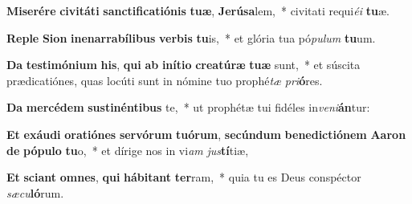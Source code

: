 \item \textbf{Mi}\textbf{se}\textbf{ré}\textbf{re} \textbf{ci}\textbf{vi}\textbf{tá}\textbf{ti} \textbf{sanc}\textbf{ti}\textbf{fi}\textbf{ca}\textbf{ti}\textbf{ó}\textbf{nis} \textbf{tu}\textbf{æ}, \textbf{Je}\textbf{rú}\textbf{sa}lem,~* civitati requi\textit{é}\textit{i} \textbf{tu}æ.
\item \textbf{Re}\textbf{ple} \textbf{Si}\textbf{on} \textbf{in}\textbf{e}\textbf{nar}\textbf{ra}\textbf{bí}\textbf{li}\textbf{bus} \textbf{ver}\textbf{bis} \textbf{tu}is,~* et glória tua pó\textit{pu}\textit{lum} \textbf{tu}um.
\item \textbf{Da} \textbf{tes}\textbf{ti}\textbf{mó}\textbf{ni}\textbf{um} \textbf{his}, \textbf{qui} \textbf{ab} \textbf{in}\textbf{í}\textbf{ti}\textbf{o} \textbf{cre}\textbf{a}\textbf{tú}\textbf{ræ} \textbf{tu}\textbf{æ} sunt,~* et súscita prædicatiónes, quas locúti sunt in nómine tuo prophé\textit{tæ} \textit{pri}\textbf{ó}res.
\item \textbf{Da} \textbf{mer}\textbf{cé}\textbf{dem} \textbf{sus}\textbf{ti}\textbf{nén}\textbf{ti}\textbf{bus} te,~* ut prophétæ tui fidéles in\textit{ve}\textit{ni}\textbf{án}tur:
\item \textbf{Et} \textbf{ex}\textbf{áu}\textbf{di} \textbf{o}\textbf{ra}\textbf{ti}\textbf{ó}\textbf{nes} \textbf{ser}\textbf{vó}\textbf{rum} \textbf{tu}\textbf{ó}\textbf{rum}, \textbf{se}\textbf{cún}\textbf{dum} \textbf{be}\textbf{ne}\textbf{dic}\textbf{ti}\textbf{ó}\textbf{nem} \textbf{A}\textbf{a}\textbf{ron} \textbf{de} \textbf{pó}\textbf{pu}\textbf{lo} \textbf{tu}o,~* et dírige nos in vi\textit{am} \textit{jus}\textbf{tí}tiæ,
\item \textbf{Et} \textbf{sci}\textbf{ant} \textbf{om}\textbf{nes}, \textbf{qui} \textbf{há}\textbf{bi}\textbf{tant} \textbf{ter}ram,~* quia tu es Deus conspéctor \textit{sæ}\textit{cu}\textbf{ló}rum.
